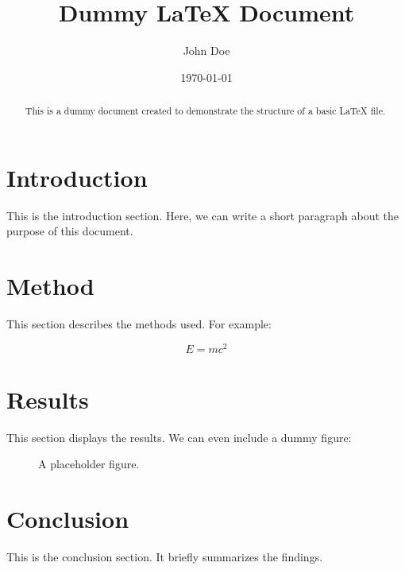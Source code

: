 \documentclass[12pt]{article}
\title{Dummy LaTeX Document}
\author{John Doe}
\date{\today}
\begin{document}
\maketitle

\begin{abstract}
This is a dummy document created to demonstrate the structure of a basic \LaTeX{} file.
\end{abstract}

\section{Introduction}
This is the introduction section. Here, we can write a short paragraph about the purpose of this document.

\section{Method}
This section describes the methods used. For example:

\begin{equation}
E = mc^2
\end{equation}

\section{Results}
This section displays the results. We can even include a dummy figure:

\begin{figure}[h]
\centering
{}
\caption{A placeholder figure.}
\end{figure}

\section{Conclusion}
This is the conclusion section. It briefly summarizes the findings.
\end{document}
